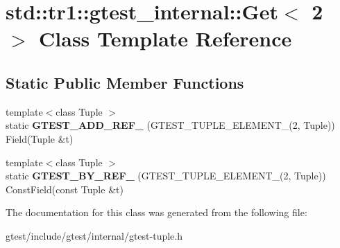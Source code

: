 \hypertarget{classstd_1_1tr1_1_1gtest__internal_1_1Get_3_012_01_4}{}\section{std\+:\+:tr1\+:\+:gtest\+\_\+internal\+:\+:Get$<$ 2 $>$ Class Template Reference}
\label{classstd_1_1tr1_1_1gtest__internal_1_1Get_3_012_01_4}
\subsection*{Static Public Member Functions}
\begin{DoxyCompactItemize}
\item 
\mbox{\label{classstd_1_1tr1_1_1gtest__internal_1_1Get_3_012_01_4_a8dfe7b5c1c915f10181e3fb5952ba6d8}} 
{\footnotesize template$<$class Tuple $>$ }\\static {\bfseries G\+T\+E\+S\+T\+\_\+\+A\+D\+D\+\_\+\+R\+E\+F\+\_\+} (G\+T\+E\+S\+T\+\_\+\+T\+U\+P\+L\+E\+\_\+\+E\+L\+E\+M\+E\+N\+T\+\_\+(2, Tuple)) Field(Tuple \&t)
\item 
\mbox{\label{classstd_1_1tr1_1_1gtest__internal_1_1Get_3_012_01_4_a76127c9c03c1f0caa61fb87d4d756b5b}} 
{\footnotesize template$<$class Tuple $>$ }\\static {\bfseries G\+T\+E\+S\+T\+\_\+\+B\+Y\+\_\+\+R\+E\+F\+\_\+} (G\+T\+E\+S\+T\+\_\+\+T\+U\+P\+L\+E\+\_\+\+E\+L\+E\+M\+E\+N\+T\+\_\+(2, Tuple)) Const\+Field(const Tuple \&t)
\end{DoxyCompactItemize}


The documentation for this class was generated from the following file\+:\begin{DoxyCompactItemize}
\item 
gtest/include/gtest/internal/gtest-\/tuple.\+h\end{DoxyCompactItemize}
